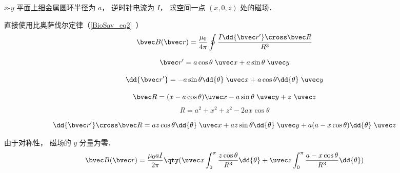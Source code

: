 
\begin{issues}
\issueDraft
\end{issues}


$x$-$y$ 平面上细金属圆环半径为 $a$， 逆时针电流为 $I$， 求空间一点 $(x, 0, z)$ 处的磁场．

直接使用比奥萨伐尔定律（\autoref{BioSav_eq2}~）
\begin{equation}
\bvec B(\bvec r) = \frac{\mu_0}{4\pi} \oint \frac{I \dd{\bvec r'} \cross \bvec R}{R^3}
\end{equation}

\begin{equation}
\bvec r' = a\cos\theta\; \uvec x + a\sin\theta\; \uvec y
\end{equation}

\begin{equation}
\dd{\bvec r'} = -a\sin \theta \dd{\theta}\; \uvec x + a\cos \theta \dd{\theta}\; \uvec y
\end{equation}

\begin{equation}
\bvec R = (x - a\cos\theta)\uvec x - a\sin\theta \;\uvec y+ z\ \uvec z
\end{equation}
\begin{equation}
R = a^2 + x^2 + z^2 - 2ax\cos\theta
\end{equation}


\begin{equation}
\dd{\bvec r'} \cross \bvec R = az \cos\theta \dd{\theta} \;\uvec x + az\sin\theta \dd{\theta} \;\uvec y + a(a - x\cos\theta)\dd{\theta}\;\uvec z
\end{equation}

由于对称性， 磁场的 $y$ 分量为零．
\begin{equation}
\bvec B(\bvec r) = \frac{\mu_0 a I}{2\pi} \qty(\uvec x\int_0^\pi \frac{z \cos\theta}{R^3} \dd{\theta} + \uvec z\int_0^\pi \frac{a - x\cos\theta}{R^3} \dd{\theta})
\end{equation}
